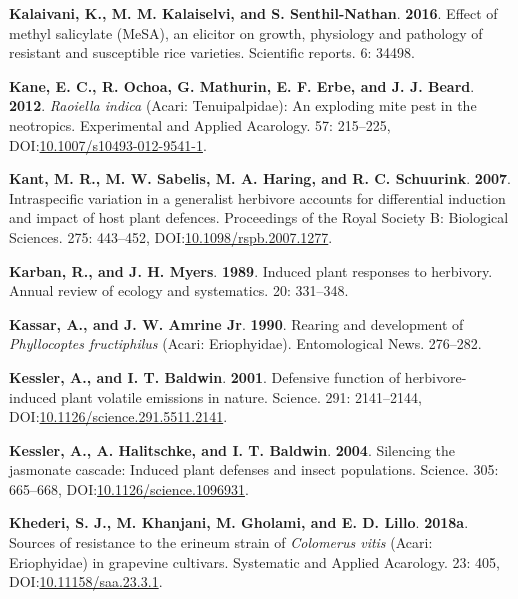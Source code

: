 \documentclass[12pt,final,CPage]{ufthesis}
\newlength{\cslhangindent}
\newenvironment{CSLReferences}[2] %
{%
	\setlength{\parindent}{0pt}
	\ifodd #1 \everypar{\setlength{\hangindent}{\cslhangindent}}\ignorespaces\fi
	\ifnum #2 > 0
	\setlength{\parskip}{#2\baselineskip}
	\fi
}%
{}
\begin{document}
{\begin{CSLReferences}{1}{0}
  \leavevmode{}%
  \textbf{Kalaivani, K., M. M. Kalaiselvi, and S. Senthil-Nathan}. \textbf{2016}. Effect of methyl salicylate {(MeSA)}, an elicitor on growth, physiology and pathology of resistant and susceptible rice varieties. Scientific reports. 6: 34498.

  \leavevmode{}%
  \textbf{Kane, E. C., R. Ochoa, G. Mathurin, E. F. Erbe, and J. J. Beard}. \textbf{2012}. {\emph{Raoiella indica}} ({Acari}: {Tenuipalpidae}): An exploding mite pest in the neotropics. Experimental and Applied Acarology. 57: 215--225, DOI:\href{https://doi.org/10.1007/s10493-012-9541-1}{10.1007/s10493-012-9541-1}.

  \leavevmode{}%
  \textbf{Kant, M. R., M. W. Sabelis, M. A. Haring, and R. C. Schuurink}. \textbf{2007}. Intraspecific variation in a generalist herbivore accounts for differential induction and impact of host plant defences. Proceedings of the Royal Society B: Biological Sciences. 275: 443--452, DOI:\href{https://doi.org/10.1098/rspb.2007.1277}{10.1098/rspb.2007.1277}.

  \leavevmode{}%
  \textbf{Karban, R., and J. H. Myers}. \textbf{1989}. Induced plant responses to herbivory. Annual review of ecology and systematics. 20: 331--348.

  \leavevmode{}%
  \textbf{Kassar, A., and J. W. Amrine Jr}. \textbf{1990}. Rearing and development of {\emph{Phyllocoptes fructiphilus}} ({Acari}: {Eriophyidae}). Entomological News. 276--282.

  \leavevmode{}%
  \textbf{Kessler, A., and I. T. Baldwin}. \textbf{2001}. Defensive function of herbivore-induced plant volatile emissions in nature. Science. 291: 2141--2144, DOI:\href{https://doi.org/10.1126/science.291.5511.2141}{10.1126/science.291.5511.2141}.

  \leavevmode{}%
  \textbf{Kessler, A., A. Halitschke, and I. T. Baldwin}. \textbf{2004}. Silencing the jasmonate cascade: Induced plant defenses and insect populations. Science. 305: 665--668, DOI:\href{https://doi.org/10.1126/science.1096931}{10.1126/science.1096931}.

  \leavevmode{}%
  \textbf{Khederi, S. J., M. Khanjani, M. Gholami, and E. D. Lillo}. \textbf{2018a}. Sources of resistance to the erineum strain of {\emph{Colomerus vitis}} ({Acari}: {Eriophyidae}) in grapevine cultivars. Systematic and Applied Acarology. 23: 405, DOI:\href{https://doi.org/10.11158/saa.23.3.1}{10.11158/saa.23.3.1}.


\end{CSLReferences}}
\end{document}
